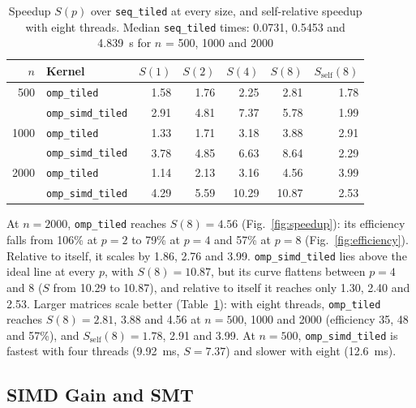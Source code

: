 \documentclass[conference,a4paper]{IEEEtran}
\newcommand{\code}[1]{\texttt{#1}}
\newcommand{\seqk}{\code{seq\_tiled}}
\newcommand{\ompk}{\code{omp\_tiled}}
\newcommand{\simdk}{\code{omp\_simd\_tiled}}
\newcommand{\Sself}{S_{\mathrm{self}}}
\begin{document}
\begin{table}[t]
  \centering
  \caption{Speedup $S(p)$ over \seqk{} at every size, and self-relative
           speedup with eight threads. Median \seqk{} times: 0.0731, 0.5453
           and 4.839~s for $n$ = 500, 1000 and 2000}
  \label{tab:speedup}
  \footnotesize
  \setlength{\tabcolsep}{4.5pt}
  \begin{tabular}{@{}rlrrrrr@{}}
    \toprule
    $n$ & Kernel & $S(1)$ & $S(2)$ & $S(4)$ & $S(8)$ & $\Sself(8)$ \\
    \midrule
    500  & \ompk  & 1.58 & 1.76 & 2.25  & 2.81  & 1.78 \\
         & \simdk & 2.91 & 4.81 & 7.37  & 5.78  & 1.99 \\
    \midrule
    1000 & \ompk  & 1.33 & 1.71 & 3.18  & 3.88  & 2.91 \\
         & \simdk & 3.78 & 4.85 & 6.63  & 8.64  & 2.29 \\
    \midrule
    2000 & \ompk  & 1.14 & 2.13 & 3.16  & 4.56  & 3.99 \\
         & \simdk & 4.29 & 5.59 & 10.29 & 10.87 & 2.53 \\
    \bottomrule
  \end{tabular}
\end{table}

At $n = 2000$, \ompk{} reaches $S(8) = 4.56$ (Fig.~\ref{fig:speedup}): its
efficiency falls from 106\% at $p = 2$ to 79\% at $p = 4$ and 57\% at $p = 8$
(Fig.~\ref{fig:efficiency}). Relative to itself, it scales by 1.86, 2.76 and
3.99. \simdk{} lies above the ideal line at every $p$, with $S(8) = 10.87$,
but its curve flattens between $p = 4$ and 8 ($S$ from 10.29 to 10.87), and
relative to itself it reaches only 1.30, 2.40 and 2.53. Larger matrices scale
better (Table~\ref{tab:speedup}): with eight threads, \ompk{} reaches
$S(8) = 2.81$, 3.88 and 4.56 at $n = 500$, 1000 and 2000 (efficiency 35, 48 and
57\%), and $\Sself(8) = 1.78$, 2.91 and 3.99. At $n = 500$, \simdk{} is
fastest with four threads (9.92~ms, $S = 7.37$) and slower with eight
(12.6~ms).

\subsection{SIMD Gain and SMT}
\label{sec:res-simd}
\end{document}
